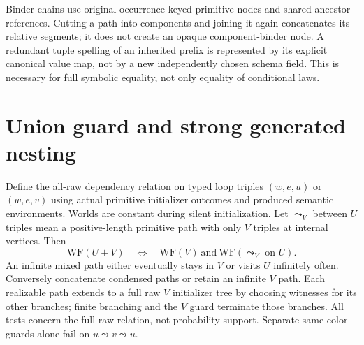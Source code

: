 \documentclass[11pt]{article}
\begin{document}
Binder chains use original occurrence-keyed primitive nodes and shared ancestor references. Cutting a path into components and joining it again concatenates its relative segments; it does not create an opaque component-binder node. A redundant tuple spelling of an inherited prefix is represented by its explicit canonical value map, not by a new independently chosen schema field. This is necessary for full symbolic equality, not only equality of conditional laws.

\section{Union guard and strong generated nesting}
Define the all-raw dependency relation on typed loop triples $(w,e,u)$ or $(w,e,v)$ using actual primitive initializer outcomes and produced semantic environments. Worlds are constant during silent initialization. Let $\leadsto_V$ between $U$ triples mean a positive-length primitive path with only $V$ triples at internal vertices. Then
\[
 \mathrm{WF}(U+V)\quad\Longleftrightarrow\quad
 \mathrm{WF}(V)\ \text{and}\ \mathrm{WF}(\leadsto_V\text{ on }U).
\]
An infinite mixed path either eventually stays in $V$ or visits $U$ infinitely often. Conversely concatenate condensed paths or retain an infinite $V$ path. Each realizable path extends to a full raw $V$ initializer tree by choosing witnesses for its other branches; finite branching and the $V$ guard terminate those branches. All tests concern the full raw relation, not probability support. Separate same-color guards alone fail on $u\leadsto v\leadsto u$.
\end{document}
